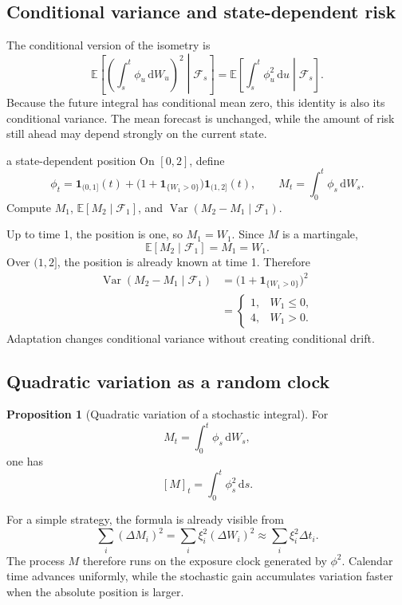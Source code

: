 \documentclass[10pt]{article}
\newcommand{\E}{\mathbb E}
\newcommand{\1}{\mathbf 1}
\newcommand{\cF}{\mathcal F}
\newcommand{\dd}{\,\mathrm d}
\DeclareMathOperator{\Var}{Var}
\theoremstyle{definition}
\newtheorem{proposition}[definition]{Proposition}
\begin{document}
\subsection{Conditional variance and state-dependent risk}

The conditional version of the isometry is
\[
\boxed{
\E\left[
\left(\int_s^t\phi_u\dd W_u\right)^2
\middle|\cF_s
\right]
=\E\left[
\int_s^t\phi_u^2\dd u
\middle|\cF_s
\right].}
\]
Because the future integral has conditional mean zero, this identity is also
its conditional variance. The mean forecast is unchanged, while the amount of
risk still ahead may depend strongly on the current state.

\begin{studentexercise}{a state-dependent position}
On \([0,2]\), define
\[
\phi_t=\1_{(0,1]}(t)
+\bigl(1+\1_{\{W_1>0\}}\bigr)\1_{(1,2]}(t),
\qquad
M_t=\int_0^t\phi_s\dd W_s.
\]
Compute \(M_1\), \(\E[M_2\mid\cF_1]\), and
\(\Var(M_2-M_1\mid\cF_1)\).
\end{studentexercise}

\begin{shortsolution}
Up to time 1, the position is one, so \(M_1=W_1\). Since \(M\) is a
martingale,
\[
\E[M_2\mid\cF_1]=M_1=W_1.
\]
Over \((1,2]\), the position is already known at time 1. Therefore
\begin{align*}
\Var(M_2-M_1\mid\cF_1)
&=\bigl(1+\1_{\{W_1>0\}}\bigr)^2\\
&=\begin{cases}
1,&W_1\leq0,\\
4,&W_1>0.
\end{cases}
\end{align*}
Adaptation changes conditional variance without creating conditional drift.
\end{shortsolution}

\subsection{Quadratic variation as a random clock}

\begin{proposition}[Quadratic variation of a stochastic integral]
For
\[
M_t=\int_0^t\phi_s\dd W_s,
\]
one has
\[
\boxed{[M]_t=\int_0^t\phi_s^2\dd s.}
\]
\end{proposition}

For a simple strategy, the formula is already visible from
\[
\sum_i(\Delta M_i)^2
=\sum_i\xi_i^2(\Delta W_i)^2
\approx\sum_i\xi_i^2\Delta t_i.
\]
The process \(M\) therefore runs on the exposure clock generated by
\(\phi^2\). Calendar time advances uniformly, while the stochastic gain
accumulates variation faster when the absolute position is larger.
\end{document}
